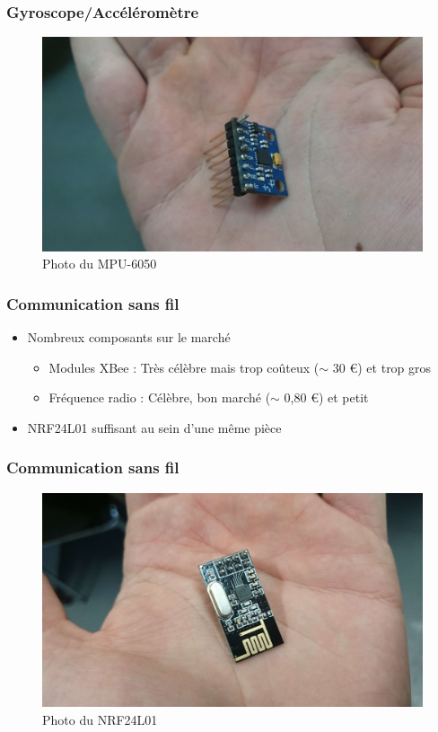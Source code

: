 \documentclass{beamer}
\begin{document}
{	\begin{frame}
	  \frametitle{Gyroscope/Accéléromètre}
	
	  \begin{figure}[htbp]
	    \centering
	    \includegraphics[scale=0.05]{img/mpu6050.jpg}
	    \caption{Photo du MPU-6050}
	  \end{figure} 
	\end{frame}
	
	\begin{frame} %
	  \frametitle{Communication sans fil}
	
	  \begin{itemize}
	    \item Nombreux composants sur le marché
	    \begin{itemize}
	      \item Modules XBee : Très célèbre mais trop coûteux ($\sim$ 30 \euro) et trop gros
	      \item Fréquence radio : Célèbre, bon marché ($\sim$ 0,80 \euro) et petit
	    \end{itemize}
	    \item NRF24L01 suffisant au sein d'une même pièce
	  \end{itemize}
	\end{frame}
	
	\begin{frame}
	  \frametitle{Communication sans fil}
	
	  \begin{figure}[htbp]
	    \centering
	    \includegraphics[scale=0.05]{img/nrf24l01.jpg}
	    \caption{Photo du NRF24L01}
	  \end{figure} 
	\end{frame}
	
}
\end{document}
